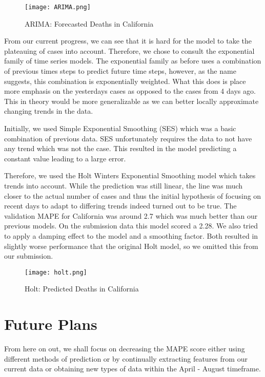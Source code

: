 \documentclass[sigconf]{acmart}
\begin{document}
\begin{figure}
  \centering
  \texttt{[image: ARIMA.png]}
  \caption{ARIMA: Forecasted Deaths in California}
\end{figure}

From our current progress, we can see that it is hard for the model to take the
plateauing of cases into account. Therefore, we chose to consult the
exponential family of time series models. The exponential family as before uses
a combination of previous times steps to predict future time steps, however, as
the name suggests, this combination is exponentially weighted. What this does
is place more emphasis on the yesterdays cases as opposed to the cases from 4
days ago. This in theory would be more generalizable as we can better locally
approximate changing trends in the data. 

Initially, we used Simple Exponential Smoothing (SES) which was a basic
combination of previous data. SES unfortunately requires the data to not have
any trend which was not the case. This resulted in the model predicting a
constant value leading to a large error. 

Therefore, we used the Holt Winters Exponential Smoothing model which takes
trends into account. While the prediction was still linear, the line was much
closer to the actual number of cases and thus the initial hypothesis of
focusing on recent days to adapt to differing trends indeed turned out to be
true. The validation MAPE for California was around 2.7 which was much better
than our previous models. On the submission data this model scored a 2.28. We
also tried to apply a damping effect to the model and a smoothing factor. Both
resulted in slightly worse performance that the original Holt model, so we
omitted this from our submission.

\begin{figure}
  \centering
  \texttt{[image: holt.png]}
  \caption{Holt: Predicted Deaths in California}
\end{figure}

\section{Future Plans}

From here on out, we shall focus on decreasing the MAPE score either using
different methods of prediction or by continually extracting features from our
current data or obtaining new types of data within the April - August
timeframe.
\end{document}

